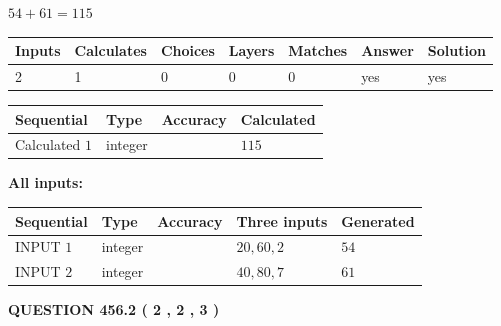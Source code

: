 \documentclass[12pt]{article}
\begin{document}
 

$ %
54 +  %
61=   %
115$
 
 
\noindent{}
 
 

 
   
   
   
   
\noindent\begin{tabular}{|l|l|l|l|l|l|l|}
 \hline
Inputs & Calculates & Choices & Layers & Matches & Answer & Solution \\ \hline
 2  & 
 1  & 
 0
  & 
 0  & 
 0  & 
  yes & 
  yes 
  \\ \hline
 \end{tabular}
   
   
   
   
\noindent{}
   
   
  
  
\noindent\begin{tabular}{|l|l|l|l|}
\hline
 Sequential & Type & Accuracy & Calculated \\ 
\hline
 
 
  Calculated $  1 $ & integer &  & 
  $ 115 $ 
 \\  \hline  
 \end{tabular}
   
   
   
   
\noindent\vspace{0.1in}\hspace{-0.08in} {\textbf{\Large{All inputs: }}}
   
   
  
  
\noindent\begin{tabular}{|l|l|l|l|l|}
\hline
 Sequential & Type & Accuracy & Three inputs & Generated \\ 
\hline
 
 
  INPUT $  1 $ & integer &  & $
 20
 , 
 60
 , 
 2
 $ & $ 54 $ 
 \\  \hline  
 
 
  INPUT $  2 $ & integer &  & $
 40
 , 
 80
 , 
 7
 $ & $ 61 $ 
 \\  \hline  
 \end{tabular}
   
   
  
\vspace{0.2in}
  
{\textbf{\Large{QUESTION
456.2 
 ( 2 , 2 , 3 )
}}}
  
\end{document}
